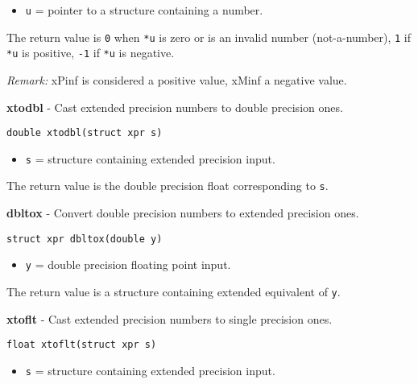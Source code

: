 \documentclass{article}
\begin{document}
\begin{itemize}
\item \texttt{u} = pointer to a structure containing a number.
\end{itemize}

The return value is \texttt{0} when \texttt{*u} is zero or
is an invalid number (not-a-number), \texttt{1} if \texttt{*u} is positive,
\texttt{-1} if \texttt{*u} is negative.

\textit{Remark:}
xPinf is considered a positive value, xMinf a negative value.


\hrulefill{}

\textbf{xtodbl} - Cast extended precision numbers to double precision ones.

\begin{verbatim}
double xtodbl(struct xpr s)
\end{verbatim}

\begin{itemize}
\item \texttt{s} = structure containing extended precision input.
\end{itemize}

The return value is the double precision float corresponding
to \texttt{s}.


\hrulefill{}

\textbf{dbltox} - Convert double precision numbers to extended precision ones.

\begin{verbatim}
struct xpr dbltox(double y)
\end{verbatim}

\begin{itemize}
\item \texttt{y} = double precision floating point input.
\end{itemize}

The return value is a structure containing extended equivalent
of \texttt{y}.


\hrulefill{}

\textbf{xtoflt} - Cast extended precision numbers to single precision ones.

\begin{verbatim}
float xtoflt(struct xpr s)
\end{verbatim}

\begin{itemize}
\item \texttt{s} = structure containing extended precision input.
\end{itemize}
\end{document}
